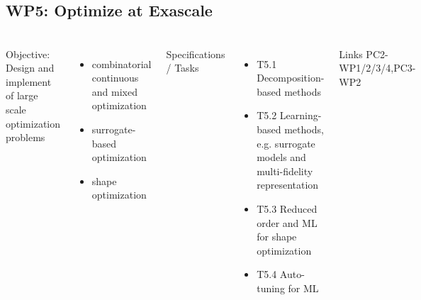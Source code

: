 \subsection{WP5: Optimize at Exascale }
\begin{frame}
  \frametitle{\insertsectionhead}
  \framesubtitle{\insertsubsectionhead}
  \begin{columns}
    Objective: Design and implement of large scale optimization problems
    \begin{itemize}
      \item combinatorial continuous and mixed optimization
      \item surrogate-based optimization
      \item shape optimization 
    \end{itemize}
    Specifications / Tasks
    \begin{itemize}
      \item T5.1 Decomposition-based methods
      \item T5.2 Learning-based methods, e.g. surrogate models and multi-fidelity representation
      \item T5.3 Reduced order and ML for shape optimization 
      \item T5.4 Auto-tuning for ML  
    \end{itemize}
    \begin{alertblock}{Links}
      PC2-WP1/2/3/4,PC3-WP2 
    \end{alertblock}
  \end{columns}
\end{frame}


